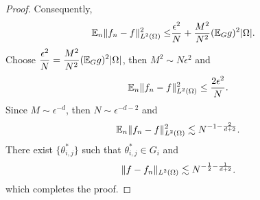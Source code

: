 \begin{proof}
Consequently,
\begin{align}  
\mathbb{E}_n \|f_n - f \|_{L^2(\Omega)}^2 
\le &{\epsilon^2 \over N} + {M^2\over N^2} (\mathbb{E}_{G}g )^2|\Omega|.
\end{align}  
Choose $\displaystyle {\epsilon^2 \over N} = {M^2\over N^2} (\mathbb{E}_{G}g )^2|\Omega|$, then $M^2\sim N\epsilon^2$ and 
$$
\mathbb{E}_n \|f_n - f \|_{L^2(\Omega)}^2 \le {2\epsilon^2 \over N}.
$$
Since $M\sim \epsilon^{-d}$, then $N\sim \epsilon^{-d-2}$ and 
$$
\mathbb{E}_n \|f_n - f \|_{L^2(\Omega)}^2 \lesssim N^{-1-{2\over d+2}}.
$$
There exist $\{\theta_{i,j}^\ast\}$ such that $\theta_{i,j}^\ast\in G_i$ and 
\begin{equation}
\| f -  f_n \|_{L^2(\Omega)}\lesssim N^{-{1\over 2}-{1\over d+2}}.
\end{equation}
which completes the proof. 


\end{proof}
